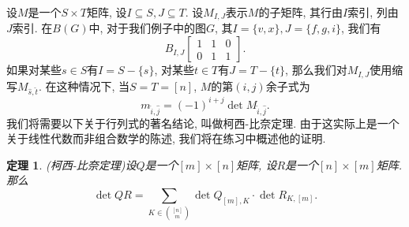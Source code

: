 \documentclass{ctexbook}
\newtheorem{thm}{定理}[section]
\begin{document}
	设$M$是一个$S\times T$矩阵, 设$I\subseteq S,J\subseteq T$. 设$M_{I,J}$表示$M$的子矩阵, 其行由$I$索引, 列由$J$索引. 在$B(G)$中, 对于我们例子中的图$G$, 其$I=\{v,x\},J=\{f,g,i\}$, 我们有
\[
	B_{I,J}\left[\begin{array}{ccc}
		1&1&0\\
		0&1&1
	\end{array}\right].
\]
	如果对某些$s\in S$有$I=S-\{s\}$, 对某些$t\in T$有$J=T-\{t\}$, 那么我们对$M_{I,J}$使用缩写$M_{\hat{s},\hat{t}}$. 在这种情况下, 当$S=T=[n]$, $M$的第$(i,j)$余子式为
\[
	m_{\hat{i},\hat{j}}=(-1)^{i+j}\operatorname{det}M_{\hat{i},\hat{j}}.
\]
	我们将需要以下关于行列式的著名结论, 叫做柯西-比奈定理. 由于这实际上是一个关于线性代数而非组合数学的陈述, 我们将在练习中概述他的证明.
\begin{thm}
	(柯西-比奈定理)设$Q$是一个$[m]\times [n]$矩阵, 设$R$是一个$[n]\times [m]$矩阵. 那么
	\[
	\operatorname{det}QR=\sum_{K\in \binom{[n]}{m}}\operatorname{det}Q_{[m],K}\cdot\operatorname{det}R_{K,[m]}.
	\]
\end{thm}
\end{document}
